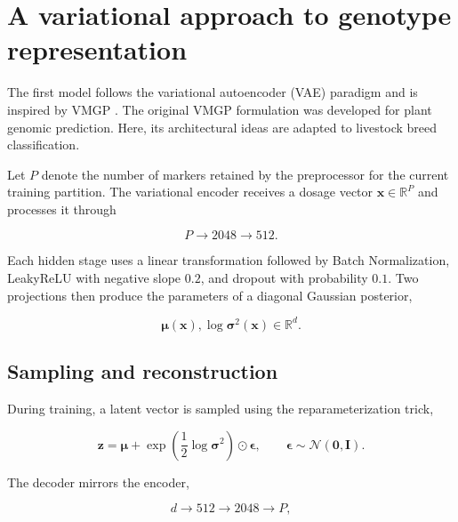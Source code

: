 \section{A variational approach to genotype representation}
\label{sec:vmgp_architecture}

The first model follows the variational autoencoder (VAE) paradigm
\cite{kingma2013auto, rezende2014stochastic} and is inspired by VMGP
\cite{zhao2025vmgp}. The original VMGP formulation was developed for
plant genomic prediction. Here, its architectural ideas are adapted to
livestock breed classification.

Let $P$ denote the number of markers retained by the preprocessor for
the current training partition. The variational encoder receives a
dosage vector $\mathbf{x}\in\mathbb{R}^{P}$ and processes it through

\begin{equation}
    P
    \rightarrow
    2048
    \rightarrow
    512.
\end{equation}

Each hidden stage uses a linear transformation followed by Batch
Normalization, LeakyReLU with negative slope $0.2$, and dropout with
probability $0.1$. Two projections then produce the parameters of a
diagonal Gaussian posterior,

\begin{equation}
    \boldsymbol{\mu}(\mathbf{x}),
    \log\boldsymbol{\sigma}^{2}(\mathbf{x})
    \in\mathbb{R}^{d}.
\end{equation}

\subsection{Sampling and reconstruction}

During training, a latent vector is sampled using the
reparameterization trick,

\begin{equation}
    \mathbf{z}
    =
    \boldsymbol{\mu}
    +
    \exp
    \left(
        \frac{1}{2}\log\boldsymbol{\sigma}^{2}
    \right)
    \odot
    \boldsymbol{\epsilon},
    \qquad
    \boldsymbol{\epsilon}
    \sim
    \mathcal{N}(\mathbf{0},\mathbf{I}).
    \label{eq:reparameterization}
\end{equation}

The decoder mirrors the encoder,

\begin{equation}
    d
    \rightarrow
    512
    \rightarrow
    2048
    \rightarrow
    P,
\end{equation}

